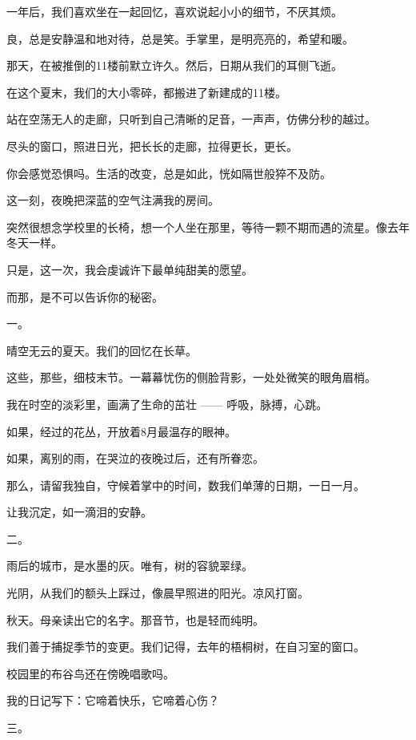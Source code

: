 \documentclass[12pt,a4paper]{article}
\newcommand{\subpart}[1]{
	\begingroup \par
	\vspace{1ex} \centering #1
	\par \endgroup
}
\begin{document}
		一年后，我们喜欢坐在一起回忆，喜欢说起小小的细节，不厌其烦。\par
		良，总是安静温和地对待，总是笑。手掌里，是明亮亮的，希望和暖。

		那天，在被推倒的11楼前默立许久。然后，日期从我们的耳侧飞逝。\par
		在这个夏末，我们的大小零碎，都搬进了新建成的11楼。\par
		站在空荡无人的走廊，只听到自己清晰的足音，一声声，仿佛分秒的越过。\par
		尽头的窗口，照进日光，把长长的走廊，拉得更长，更长。\par
		你会感觉恐惧吗。生活的改变，总是如此，恍如隔世般猝不及防。

		这一刻，夜晚把深蓝的空气注满我的房间。\par
		突然很想念学校里的长椅，想一个人坐在那里，等待一颗不期而遇的流星。像去年冬天一样。\par
		只是，这一次，我会虔诚许下最单纯甜美的愿望。

		而那，是不可以告诉你的秘密。

	\endwriting



		\subpart{一。}

		晴空无云的夏天。我们的回忆在长草。\par
		这些，那些，细枝末节。一幕幕忧伤的侧脸背影，一处处微笑的眼角眉梢。\par
		我在时空的淡彩里，画满了生命的茁壮 —— 呼吸，脉搏，心跳。\par
		如果，经过的花丛，开放着8月最温存的眼神。\par
		如果，离别的雨，在哭泣的夜晚过后，还有所眷恋。\par
		那么，请留我独自，守候着掌中的时间，数我们单薄的日期，一日一月。\par
		让我沉定，如一滴泪的安静。

		\subpart{二。}

		雨后的城市，是水墨的灰。唯有，树的容貌翠绿。\par
		光阴，从我们的额头上踩过，像晨早照进的阳光。凉风打窗。\par
		秋天。母亲读出它的名字。那音节，也是轻而纯明。\par
		我们善于捕捉季节的变更。我们记得，去年的梧桐树，在自习室的窗口。\par
		校园里的布谷鸟还在傍晚唱歌吗。\par
		我的日记写下：它啼着快乐，它啼着心伤？

		\subpart{三。}
\end{document}
